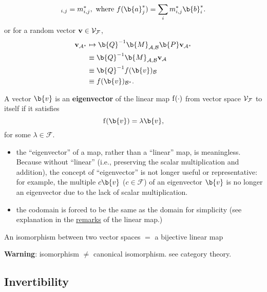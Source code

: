 \begin{corollary}
\begin{equation*}
        [\b{Q}^{-1}\b{MP}]_{i,j} = m^*_{i,j}, \textnormal{ where } f(\b{a}_j^*) = \sum_i m^*_{i,j} \b{b}^*_i.
    \end{equation*}
    or for a random vector $\mathbf{v} \in \mathcal{V}_{\mathcal{F}}$,
    \begin{align*}
        \vv_{\mathcal{A^*}} &\mapsto \b{Q}^{-1}\b{M}_{\mathcal{A,B}} \b{P}\vv_{\mathcal{A^*}} \\
        &\equiv \b{Q}^{-1}\b{M}_{\mathcal{A,B}} \vv_{\mathcal{A}}\\
        &\equiv \b{Q}^{-1} f(\b{v})_{\mathcal{B}}\\
        &\equiv f(\b{v})_{\mathcal{B^*}}.
    \end{align*}
\end{corollary}


\begin{definition} 
A vector $\b{v}$ is an \textbf{eigenvector} of the linear map $\operatorname{f}(\cdot)$ from vector space $\mathcal{V}_{\mathcal{F}}$ to itself if it satisfies 
$$\f( \b{v} ) = \lambda \b{v},$$
for some $\lambda \in \mathcal{F}$. 
\end{definition}
%
\begin{remark}
%
\noindent 
%
\begin{itemize}
    \item the ``eigenvector'' of a map, rather than a ``linear'' map, is meaningless.
    Because without ``linear'' (i.e., preserving the scalar multiplication and addition), the concept of ``eigenvector'' is not longer useful or representative: for example, the multiple $c\b{v}$ ($c \in \mathcal{F}$) of an eigenvector $\b{v}$ is no longer an eigenvector due to the lack of scalar multiplication.
    \item the codomain is forced to be the same as the domain for simplicity (see explanation in the \hyperref[remark:linearmap]{remarks} of the linear map.)
\end{itemize}
%
\end{remark}

\begin{definition} 
An isomorphism between two vector spaces $=$  a bijective linear map
\end{definition}
%
\textbf{Warning}: isomorphism $\neq$ canonical isomorphism. see category theory.







\subsection{Invertibility}

